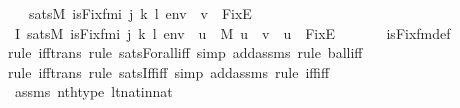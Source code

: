 \begin{isabellebody}
\ \ \ {\isachardoublequoteopen}sats{\isacharparenleft}{\kern0pt}M{\isacharcomma}{\kern0pt}\ is{\isacharunderscore}{\kern0pt}Fix{\isacharunderscore}{\kern0pt}fm{\isacharparenleft}{\kern0pt}i{\isacharcomma}{\kern0pt}\ j{\isacharcomma}{\kern0pt}\ k{\isacharcomma}{\kern0pt}\ l{\isacharparenright}{\kern0pt}{\isacharcomma}{\kern0pt}\ env{\isacharparenright}{\kern0pt}\ {\isasymlongleftrightarrow}\ v\ {\isacharequal}{\kern0pt}\ Fix{\isacharparenleft}{\kern0pt}E{\isacharparenright}{\kern0pt}{\isachardoublequoteclose}\ \isanewline
%
\isadelimproof
%
\endisadelimproof
%
\isatagproof
{}\isamarkupfalse%
{\isacharminus}{\kern0pt}\isanewline
\ \ \isamarkupfalse%
\ I{}{\isacharcolon}{\kern0pt}\ {\isachardoublequoteopen}sats{\isacharparenleft}{\kern0pt}M{\isacharcomma}{\kern0pt}\ is{\isacharunderscore}{\kern0pt}Fix{\isacharunderscore}{\kern0pt}fm{\isacharparenleft}{\kern0pt}i{\isacharcomma}{\kern0pt}\ j{\isacharcomma}{\kern0pt}\ k{\isacharcomma}{\kern0pt}\ l{\isacharparenright}{\kern0pt}{\isacharcomma}{\kern0pt}\ env{\isacharparenright}{\kern0pt}\ {\isasymlongleftrightarrow}\ {\isacharparenleft}{\kern0pt}{\isasymforall}u\ {\isasymin}\ M{\isachardot}{\kern0pt}\ u\ {\isasymin}\ v\ {\isasymlongleftrightarrow}\ u\ {\isasymin}\ Fix{\isacharparenleft}{\kern0pt}E{\isacharparenright}{\kern0pt}{\isacharparenright}{\kern0pt}{\isachardoublequoteclose}\ \isanewline
\ \ \ \ \isamarkupfalse%
\ is{\isacharunderscore}{\kern0pt}Fix{\isacharunderscore}{\kern0pt}fm{\isacharunderscore}{\kern0pt}def\isanewline
\ \ \ \ \isamarkupfalse%
{\isacharparenleft}{\kern0pt}rule\ iff{\isacharunderscore}{\kern0pt}trans{\isacharcomma}{\kern0pt}\ rule\ sats{\isacharunderscore}{\kern0pt}Forall{\isacharunderscore}{\kern0pt}iff{\isacharcomma}{\kern0pt}\ simp\ add{\isacharcolon}{\kern0pt}assms{\isacharcomma}{\kern0pt}\ rule\ ball{\isacharunderscore}{\kern0pt}iff{\isacharparenright}{\kern0pt}\isanewline
\ \ \ \ \isamarkupfalse%
{\isacharparenleft}{\kern0pt}rule\ iff{\isacharunderscore}{\kern0pt}trans{\isacharcomma}{\kern0pt}\ rule\ sats{\isacharunderscore}{\kern0pt}Iff{\isacharunderscore}{\kern0pt}iff{\isacharcomma}{\kern0pt}\ simp\ add{\isacharcolon}{\kern0pt}assms{\isacharcomma}{\kern0pt}\ rule\ iff{\isacharunderscore}{\kern0pt}iff{\isacharparenright}{\kern0pt}\isanewline
\ \ \ \ \isamarkupfalse%
\ assms\ nth{\isacharunderscore}{\kern0pt}type\ lt{\isacharunderscore}{\kern0pt}nat{\isacharunderscore}{\kern0pt}in{\isacharunderscore}{\kern0pt}nat\isanewline
\ \ \ \ \ \isamarkupfalse%

\end{isabellebody}
